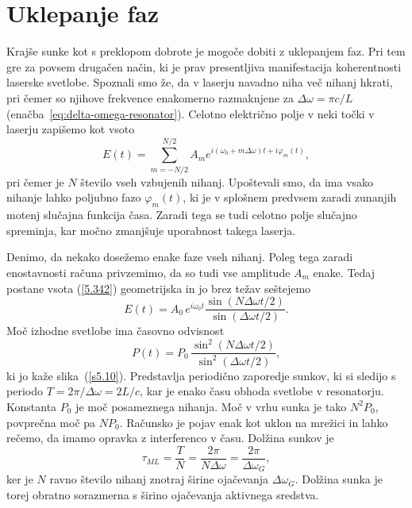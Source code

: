 \section{Uklepanje faz}
\label{chap:Uklepanje}
Krajše sunke kot s preklopom dobrote je mogoče dobiti z uklepanjem faz.
Pri tem gre za povsem drugačen način, ki je prav presentljiva manifestacija koherentnosti
laserske svetlobe. Spoznali smo že, da v laserju navadno niha več nihanj hkrati,
pri čemer so njihove frekvence enakomerno razmaknjene za $\Delta \omega =\pi c/L$ 
(enačba~\ref{eq:delta-omega-resonator}). Celotno električno
polje v neki točki v laserju zapišemo kot vsoto 
\begin{equation}
E(t)=\sum_{m=-N/2}^{N/2}A_{m}e^{i(\omega _{0}+m\Delta \omega )t+i\varphi
_{m}(t)},
\label{5.342}
\end{equation}
pri čemer je $N$ število vseh vzbujenih nihanj. Upoštevali smo, da ima vsako
nihanje lahko poljubno fazo $\varphi _{m}(t)$, ki je v splošnem predvsem
zaradi zunanjih motenj slučajna funkcija časa. Zaradi tega se tudi
celotno polje slučajno spreminja, kar močno zmanjšuje uporabnost
takega laserja.

Denimo, da nekako dosežemo enake faze vseh nihanj. Poleg tega zaradi enostavnosti
računa privzemimo, da so tudi vse amplitude $A_{m}$ enake. Tedaj
postane vsota (\ref{5.342}) geometrijska in jo brez težav seštejemo 
\begin{equation}
E(t)=A_{0}\,e^{i\omega _{0}t}\frac{\sin (N\Delta \omega t/2)}{\sin(\Delta
\omega t/2)}.
\label{5.352}
\end{equation}
Moč izhodne svetlobe ima časovno odvisnost 
\begin{equation}
P(t)=P_{0}\,\frac{\sin ^{2}(N\Delta \omega t/2)}{\sin ^{2}(\Delta \omega t/2)},
\label{5.36}
\end{equation}
ki jo kaže slika~(\ref{s5.10}). Predstavlja periodično zaporedje sunkov, ki
si sledijo s periodo $T=2\pi /\Delta \omega =2L/c$, kar je enako času obhoda
svetlobe v resonatorju. Konstanta $P_{0}$ je moč posameznega nihanja.
Moč v vrhu sunka je tako $N^{2}P_{0}$, povprečna moč pa $NP_{0}$.
Računsko je pojav enak kot uklon na mrežici in lahko rečemo, da imamo
opravka z interferenco v času. Dolžina sunkov je 
\begin{equation}
\tau_{ML}=\frac{T}{N}=\frac{2\pi }{N\Delta \omega }=\frac{2\pi }{\Delta
\omega_{G}},
\label{5.37}
\end{equation}
ker je $N$ ravno število nihanj znotraj širine ojačevanja $\Delta
\omega _{G}$. Dolžina sunka je torej obratno sorazmerna s širino
ojačevanja aktivnega sredstva.

